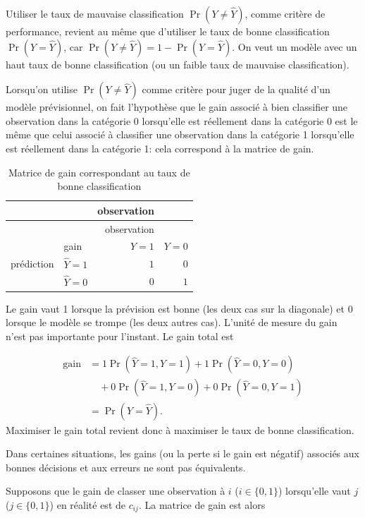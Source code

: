 \documentclass[
  11pt,
  letterpaper,
]{scrbook}
\theoremstyle{definition}
\theoremstyle{remark}
\begin{document}
Utiliser le taux de mauvaise classification \(\Pr(Y \neq \widehat{Y})\),
comme critère de performance, revient au même que d'utiliser le taux de
bonne classification \(\Pr(Y=\widehat{Y})\), car
\(\Pr(Y \neq \widehat{Y}) = 1-\Pr(Y=\widehat{Y})\). On veut un modèle
avec un haut taux de bonne classification (ou un faible taux de mauvaise
classification).

Lorsqu'on utilise \(\Pr(Y \neq \widehat{Y})\) comme critère pour juger
de la qualité d'un modèle prévisionnel, on fait l'hypothèse que le gain
associé à bien classifier une observation dans la catégorie 0
lorsqu'elle est réellement dans la catégorie 0 est le même que celui
associé à classifier une observation dans la catégorie 1 lorsqu'elle est
réellement dans la catégorie 1: cela correspond à la matrice de gain.

\hypertarget{tbl-03-gain1}{}
\begin{longtable}[]{@{}llrr@{}}
\caption{\label{tbl-03-gain1}Matrice de gain correspondant au taux de
bonne classification}\tabularnewline
\toprule()
& & observation & \\
\midrule()
\endfirsthead
\toprule()
& & observation & \\
\midrule()
\endhead
& gain & \(Y=1\) & \(Y=0\) \\
prédiction & \(\widehat{Y}=1\) & \(1\) & \(0\) \\
& \(\widehat{Y}=0\) & \(0\) & \(1\) \\
\bottomrule()
\end{longtable}

Le gain vaut 1 lorsque la prévision est bonne (les deux cas sur la
diagonale) et 0 lorsque le modèle se trompe (les deux autres cas).
L'unité de mesure du gain n'est pas importante pour l'instant. Le gain
total est

\begin{align*}
\text{gain} &= 1 \Pr(\widehat{Y}=1, Y=1) + 1 \Pr(\widehat{Y}=0, Y=0)
\\ &\quad + 0 \Pr(\widehat{Y}=1, Y=0)  + 0 \Pr(\widehat{Y}=0, Y=1)
\\& = \Pr(Y = \widehat{Y}).
\end{align*} Maximiser le gain total revient donc à maximiser le taux de
bonne classification.

Dans certaines situations, les gains (ou la perte si le gain est
négatif) associés aux bonnes décisions et aux erreurs ne sont pas
équivalents.

Supposons que le gain de classer une observation à \(i\)
(\(i \in \{0,1\}\)) lorsqu'elle vaut \(j\) (\(j \in \{0,1\}\)) en
réalité est de \(c_{ij}\). La matrice de gain est alors
\end{document}
